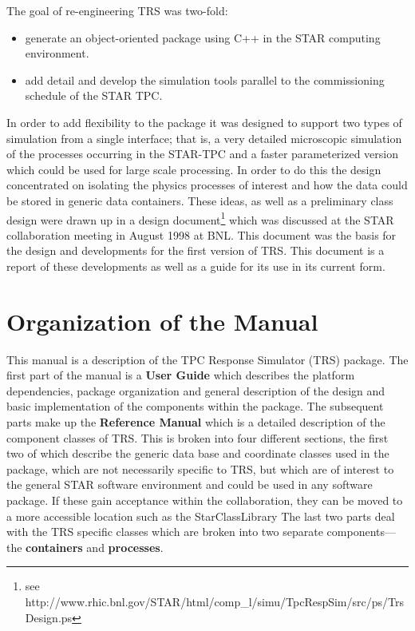 \documentclass[twoside]{article}
\newcommand{\name}[1]{\textsf{#1}}%
\begin{document}
The goal of re-engineering \name{TRS} was two-fold:
\begin{itemize}
  \item generate an object-oriented package using C++ in the
    STAR computing environment.
  \item add detail and develop the simulation tools parallel to the
    commissioning schedule of the STAR TPC.
\end{itemize}
In order to add flexibility to the package it was designed to
support two types of simulation from a single interface; that is,
a very detailed microscopic simulation of the processes occurring
in the STAR-TPC and a faster parameterized version which could be
used for large scale processing.  In order to do this the design
concentrated on isolating the physics
processes of interest and how the data could be stored in generic
data containers.  These ideas, as well as a preliminary class design
were drawn up in a design document\footnote{see http://www.rhic.bnl.gov/STAR/html/comp\_l/simu/TpcRespSim/src/ps/TrsDesign.ps} 
which was discussed at the STAR 
collaboration meeting in August 1998 at BNL.  This document was
the basis for the design and developments for the first version
of \name{TRS}.  This document is a report of these developments as well
as a guide for its use in its current form.

\section{Organization of the Manual}

This manual is a description of the \name{TPC Response Simulator} 
(\name{TRS}) package.  The first part of the manual is a {\bf User Guide} 
which describes the platform dependencies, package organization and
general description of the design and basic implementation of
the components within the package.  The subsequent parts make
up the {\bf Reference Manual} which is a detailed description of the
component classes of \name{TRS}.  This is broken into four different 
sections, the first two of which describe the generic data base
and coordinate classes used in the package, which are not necessarily
specific to TRS, but which are of interest to the general STAR
software environment and could be used in any software package.  If
these gain acceptance within the collaboration, they can be moved
to a more accessible location such as the \name{StarClassLibrary} 
The last two parts deal with the \name{TRS} specific classes which
are broken into two separate components---the {\bf containers}
and {\bf processes}.
\end{document}
